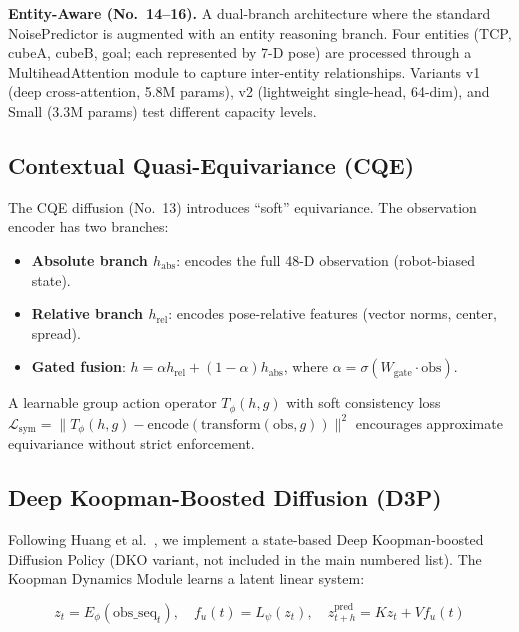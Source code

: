 \documentclass[twocolumn]{article}
\begin{document}
\noindent\textbf{Entity-Aware (No.~14--16).} A dual-branch architecture where the standard NoisePredictor is augmented with an entity reasoning branch. Four entities (TCP, cubeA, cubeB, goal; each represented by 7-D pose) are processed through a MultiheadAttention module to capture inter-entity relationships. Variants v1 (deep cross-attention, 5.8M params), v2 (lightweight single-head, 64-dim), and Small (3.3M params) test different capacity levels.

\subsection{Contextual Quasi-Equivariance (CQE)}
\label{sec:coe}

The CQE diffusion (No.~13) \cite{liao2025cqe} introduces ``soft'' equivariance. The observation encoder has two branches:

\begin{itemize}
    \item \textbf{Absolute branch $h_{\text{abs}}$}: encodes the full 48-D observation (robot-biased state).
    \item \textbf{Relative branch $h_{\text{rel}}$}: encodes pose-relative features (vector norms, center, spread).
    \item \textbf{Gated fusion}: $h = \alpha h_{\text{rel}} + (1-\alpha)h_{\text{abs}}$, where $\alpha = \sigma(W_{\text{gate}} \cdot \text{obs})$.
\end{itemize}

A learnable group action operator $T_{\phi}(h, g)$ with soft consistency loss $\mathcal{L}_{\text{sym}} = \|T_{\phi}(h, g) - \text{encode}(\text{transform}(\text{obs}, g))\|^2$ encourages approximate equivariance without strict enforcement.

\subsection{Deep Koopman-Boosted Diffusion (D3P)}
\label{sec:koopman}

Following Huang et al.\ \cite{huang2025d3p}, we implement a state-based Deep Koopman-boosted Diffusion Policy (DKO variant, not included in the main numbered list). The Koopman Dynamics Module learns a latent linear system:

\begin{equation}
    z_t = E_{\phi}(\text{obs\_seq}_t), \quad
    f_u(t) = L_{\psi}(z_t), \quad
    z_{t+h}^{\text{pred}} = K z_t + V f_u(t)
\end{equation}
\end{document}
